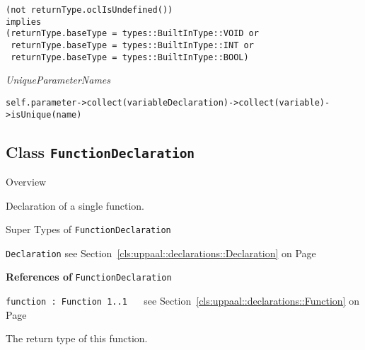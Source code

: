 \begin{longdescription}
\begin{longdescription}
		\begin{lstlisting}[breaklines=true]
(not returnType.oclIsUndefined())
implies
(returnType.baseType = types::BuiltInType::VOID or
 returnType.baseType = types::BuiltInType::INT or
 returnType.baseType = types::BuiltInType::BOOL)		\end{lstlisting}
	\item[\small\textit{UniqueParameterNames}] ~ 
	\nopagebreak
	
		\begin{lstlisting}[breaklines=true]
self.parameter->collect(variableDeclaration)->collect(variable)->isUnique(name)		\end{lstlisting}
			\end{longdescription}
	
	\end{longdescription}
	

\subsection{Class \bfseries \texttt{FunctionDeclaration}\normalfont}
\label{cls:uppaal::declarations::FunctionDeclaration} 
	
	\begin{longdescription}
		\item[Overview] 		
				

	

		Declaration of a single function.		
		\item[Super Types of \texttt{FunctionDeclaration}] ~
			\begin{longdescription}
				\item[\texttt{Declaration}] see Section~\ref{cls:uppaal::declarations::Declaration} on Page~\pageref{cls:uppaal::declarations::Declaration}						\end{longdescription}
		
	
			\item[\textbf{References of} \texttt{FunctionDeclaration}] ~
			\begin{longdescription}
	\item[\texttt{function : Function 	\symbol{"5B}1..1\symbol{"5D}
}] ~
	see Section~\ref{cls:uppaal::declarations::Function} on Page~\pageref{cls:uppaal::declarations::Function}
	
	\nopagebreak
		
				

	

		The return type of this function.		
			\end{longdescription}
	
	\end{longdescription}
	

